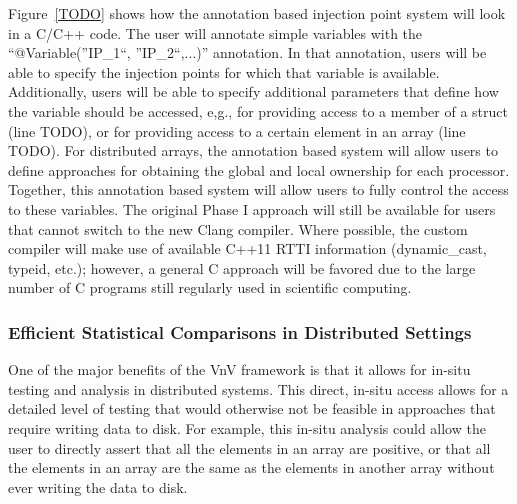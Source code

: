 Figure~\ref{TODO} shows how the annotation based injection point system will look in a C/C++ code. The user will annotate simple variables with the ``@Variable(''IP\_1``, ''IP\_2``,...)'' annotation. In that annotation, users will be able to specify the injection points for which that variable is available. Additionally, users will be able to specify additional parameters that define how the variable should be accessed, e,g., for providing access to a member of a struct (line TODO), or for providing access to a certain element in an array (line TODO). For distributed arrays, the annotation based system will allow users to define approaches for obtaining the global and local ownership for each processor. Together, this annotation based system will allow users to fully control the access to these variables. The original Phase I approach will still be available for users that cannot switch to the new Clang compiler. Where possible, the custom compiler will make use of available C++11 RTTI information (dynamic\_cast, typeid, etc.); however, a general C approach will be favored due to the large number of C programs still regularly used in scientific computing. 


\subsubsection{Efficient Statistical Comparisons in Distributed Settings} 

One of the major benefits of the VnV framework is that it allows for in-situ testing and analysis in distributed systems. This direct, in-situ access allows for a detailed level of testing that would otherwise not be feasible in \VV approaches that require writing data to disk. For example, this in-situ analysis could allow the user to directly assert that all the elements in an array are positive, or that all the elements in an array are the same as the elements in another array without ever writing the data to disk. 

